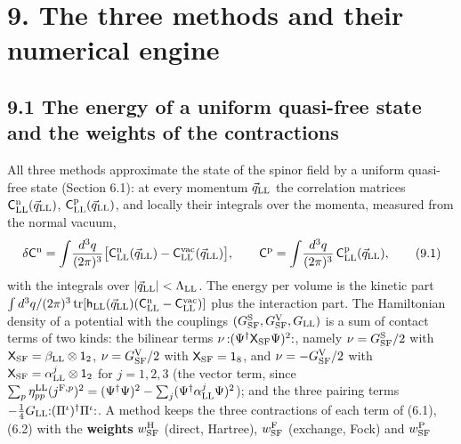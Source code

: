 \documentclass[
  10pt,
]{article}
\begin{document}
\hypertarget{the-three-methods-and-their-numerical-engine}{%
\section{9. The three methods and their numerical
engine}\label{the-three-methods-and-their-numerical-engine}}

\hypertarget{the-energy-of-a-uniform-quasi-free-state-and-the-weights-of-the-contractions}{%
\subsection{9.1 The energy of a uniform quasi-free state and the weights
of the
contractions}\label{the-energy-of-a-uniform-quasi-free-state-and-the-weights-of-the-contractions}}

All three methods approximate the state of the spinor field by a uniform
quasi-free state (Section 6.1): at every momentum \(\vec q_{\rm LL}\)
the correlation matrices
\(\mathsf C^{\rm n}_{\rm LL}(\vec q_{\rm LL})\),
\(\mathsf C^{\rm p}_{\rm LL}(\vec q_{\rm LL})\), and locally their
integrals over the momenta, measured from the normal vacuum,
\[\delta\mathsf C^{\rm n}=\int\!\frac{d^3q}{(2\pi)^3}\big[\mathsf C^{\rm n}_{\rm LL}(\vec q_{\rm LL})-\mathsf C^{\rm vac}_{\rm LL}(\vec q_{\rm LL})\big],\qquad\mathsf C^{\rm p}=\int\!\frac{d^3q}{(2\pi)^3}\,\mathsf C^{\rm p}_{\rm LL}(\vec q_{\rm LL}),\tag{9.1}\]
with the integrals over
\(\lvert\vec q_{\rm LL}\rvert<\Lambda_{\rm LL}\). The energy per volume
is the kinetic part
\(\int d^3q/(2\pi)^3\,\mathrm{tr}[\mathsf h_{\rm LL}(\vec q_{\rm LL})(\mathsf C^{\rm n}_{\rm LL}-\mathsf C^{\rm vac}_{\rm LL})]\)
plus the interaction part. The Hamiltonian density of a potential with
the couplings \((G^{\rm S}_{\rm SF},G^{\rm V}_{\rm SF},G_{\rm LL})\) is
a sum of contact terms of two kinds: the bilinear terms
\(\nu\,{:}(\Psi^\dagger\mathsf X_{\rm SF}\Psi)^2{:}\), namely
\(\nu=G^{\rm S}_{\rm SF}/2\) with
\(\mathsf X_{\rm SF}=\beta_{\rm LL}\otimes\mathsf 1_2\),
\(\nu=G^{\rm V}_{\rm SF}/2\) with \(\mathsf X_{\rm SF}=\mathsf 1_8\),
and \(\nu=-G^{\rm V}_{\rm SF}/2\) with
\(\mathsf X_{\rm SF}=\alpha^j_{\rm LL}\otimes\mathsf 1_2\) for
\(j=1,2,3\) (the vector term, since
\(\sum_p\eta^{\rm LL}_{pp}(j^{{\rm F},p})^2=(\Psi^\dagger\Psi)^2-\sum_j(\Psi^\dagger\alpha^j_{\rm LL}\Psi)^2\));
and the three pairing terms
\(-\tfrac14G_{\rm LL}{:}(\Pi^\iota)^\dagger\Pi^\iota{:}\). A method
keeps the three contractions of each term of (6.1), (6.2) with the
\textbf{weights} \(w^{\rm H}_{\rm SF}\) (direct, Hartree),
\(w^{\rm F}_{\rm SF}\) (exchange, Fock) and \(w^{\rm P}_{\rm SF}\)
\end{document}
